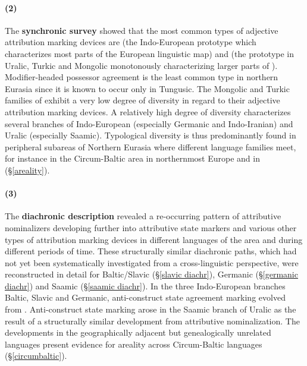 \paragraph*{(2)}
The \textbf{synchronic survey} showed that the most common types of adjective attribution marking devices are  (the Indo\hyp{}European prototype which characterizes most parts of the European linguistic map) and  (the prototype in Uralic, Turkic and Mongolic monotonously characterizing larger parts of ). Modifier\hyp{}headed possessor agreement is the least common type in northern Eurasia since it is known to occur only in Tungusic. The Mongolic and Turkic families of  exhibit a very low degree of diversity in regard to their adjective attribution marking devices. A relatively high degree of diversity characterizes several branches of Indo-European (especially Germanic and Indo-Iranian) and Uralic (especially Saamic). Typological diversity is thus predominantly found in peripheral subareas of Northern Eurasia where different language families meet, for instance in the Circum-Baltic area in northernmost Europe and in  (\S\ref{areality}).

\paragraph*{(3)}
The \textbf{diachronic description} revealed a re-occurring pattern of attributive nominalizers developing further into attributive state markers and various other types of attribution marking devices in different languages of the area and during different periods of time. These structurally similar diachronic paths, which had not yet been systematically investigated from a cross-linguistic perspective, were reconstructed in detail for Baltic\slash{}Slavic (\S\ref{slavic diachr}), Germanic (\S\ref{germanic diachr}) and Saamic (\S\ref{saamic diachr}). In the three Indo-European branches Baltic, Slavic and Germanic, anti\hyp{}construct state agreement marking evolved from . Anti\hyp{}construct state marking arose in the Saamic branch of Uralic as the result of a structurally similar development from attributive nominalization. The developments in the geographically adjacent but genealogically unrelated languages present evidence for areality across Circum-Baltic languages (\S\ref{circumbaltic}).\\

